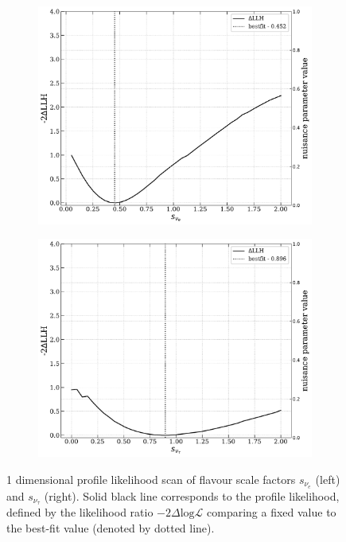 \begin{figure}[h!]
    \begin{subfigure}[h]{0.7\textwidth}
        \includegraphics{./figures/results/profile_scan_astro_nue_ratio.pdf}
    \end{subfigure}
    \hfill
    \begin{subfigure}[h]{0.7\textwidth}
        \includegraphics{./figures/results/profile_scan_astro_nutau_ratio.pdf}
    \end{subfigure}
    
    \caption{1 dimensional profile likelihood scan of flavour scale factors $s_{\nu_{e}}$ (left) and $s_{\nu_{\tau}}$ (right). Solid black line corresponds to the profile likelihood, defined by the likelihood ratio $-2\Delta\mathrm{log}\mathcal{L}$ comparing a fixed value to the best-fit value (denoted by dotted line).}
\end{figure}

